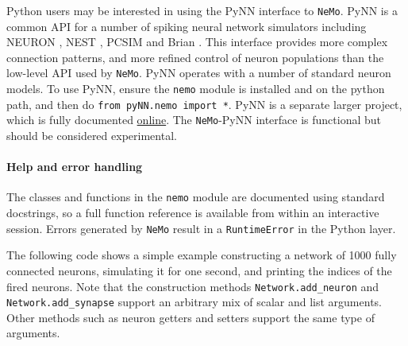 \documentclass[a4paper]{article}
\newenvironment{mintframe}
  {\begin{mdframed}[linecolor=black, topline=true, bottomline=true,
    leftline=false, rightline=false, backgroundcolor=yellow!13!white,
    nobreak=true]
  }{
  \end{mdframed}
}
\newcommand{\nemo}{\texttt{NeMo}\xspace}
\newcommand{\code}[1]{\texttt{#1}}
\newcommand{\library}[1]{\texttt{#1}}
\begin{document}
Python users may be interested in using the PyNN interface to \nemo. PyNN
\cite{davison08pynn} is a common API for a number of spiking neural network
simulators including NEURON \cite{Hines1997}, NEST \cite{Gewaltig2007}, PCSIM
\cite{Pecevski2009} and Brian \cite{Goodman2009}. This interface provides more
complex connection patterns, and more refined control of neuron populations
than the low-level API used by \nemo. PyNN operates with a number of standard
neuron models. To use PyNN, ensure the \library{nemo} module is installed and
on the python path, and then do \code{from pyNN.nemo import *}. PyNN is a
separate larger project, which is fully documented
\href{http://neuralensemble.org/trac/PyNN}{online}. The \nemo-PyNN interface is
functional but should be considered experimental.

\paragraph{Help and error handling}

The classes and functions in the \library{nemo} module are documented using
standard docstrings, so a full function reference is available from within an
interactive session. Errors generated by \nemo result in a \code{RuntimeError}
in the Python layer.
% 

The following code shows a simple example constructing a network of 1000 fully
connected neurons, simulating it for one second, and printing the indices of
the fired neurons. Note that the construction methods \code{Network.add\_neuron} and
\code{Network.add\_synapse} support an arbitrary mix of scalar and list
arguments. Other methods such as neuron getters and setters support the same
type of arguments.

\begin{mintframe}
  \inputminted{python}{example.py}
\end{mintframe}

\newpage

\end{document}

